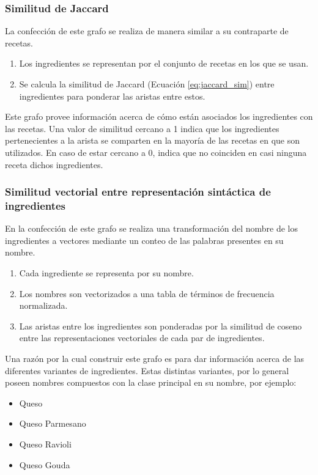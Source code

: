 \documentclass[
	a4paper, %
	10pt, %
	unnumberedsections, %
	twoside, %
]{LTJournalArticle}
\begin{document}
\subsubsection{Similitud de Jaccard}

La confección de este grafo se realiza de manera similar a su contraparte de recetas.

\begin{enumerate}
	\item Los ingredientes se representan por el conjunto de recetas en los que se usan.
	\item Se calcula la similitud de Jaccard (Ecuación \ref{eq:jaccard_sim}) entre ingredientes para ponderar las aristas
	entre estos.
\end{enumerate}

Este grafo provee información acerca de cómo están asociados los ingredientes con las recetas. Una valor de similitud
cercano a 1 indica que los ingredientes pertenecientes a la arista se comparten en la mayoría de las recetas en que son
utilizados. En caso de estar cercano a 0, indica que no coinciden en casi ninguna receta dichos ingredientes.

\subsubsection{Similitud vectorial entre representación sintáctica de ingredientes}

En la confección de este grafo se realiza una transformación del nombre de los ingredientes a vectores mediante
un conteo de las palabras presentes en su nombre.

\begin{enumerate}
	\item Cada ingrediente se representa por su nombre.
	\item Los nombres son vectorizados a una tabla de términos de frecuencia normalizada.
	\item Las aristas entre los ingredientes son ponderadas por la similitud de coseno entre las 
	representaciones vectoriales de cada par de ingredientes.
\end{enumerate}

Una razón por la cual construir este grafo es para dar información acerca de las diferentes variantes de ingredientes.
Estas distintas variantes, por lo general poseen nombres compuestos con la clase principal en su nombre, por ejemplo:

\begin{itemize}
	\item Queso
	\item Queso Parmesano
	\item Queso Ravioli
	\item Queso Gouda
\end{itemize}
\end{document}
